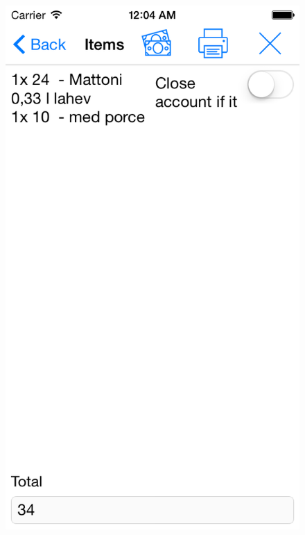 \begin{figure}
\begin{minipage}{.5\textwidth}
  \includegraphics[width=.95\textwidth]{pay2.png}
  \label{fig:paypage2}
\end{minipage}
\end{figure}